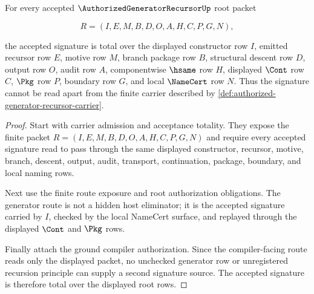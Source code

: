 \begin{theorem}
\label{thm:authorized-generator-recursor-root-signature-totality}
For every accepted $\AuthorizedGeneratorRecursorUp$ root packet

$$
R=(I,E,M,B,D,O,A,H,C,P,G,N),
$$

the accepted signature is total over the displayed constructor row $I$, emitted recursor row $E$, motive row $M$, branch package row $B$, structural descent row $D$, output row $O$, audit row $A$, componentwise $\hsame$ row $H$, displayed $\Cont$ row $C$, $\Pkg$ row $P$, boundary row $G$, and local $\NameCert$ row $N$. Thus the signature cannot be read apart from the finite carrier described by \autoref{def:authorized-generator-recursor-carrier}.
\end{theorem}
\begin{proof}
Start with carrier admission and acceptance totality. They expose the finite packet $R=(I,E,M,B,D,O,A,H,C,P,G,N)$ and require every accepted signature read to pass through the same displayed constructor, recursor, motive, branch, descent, output, audit, transport, continuation, package, boundary, and local naming rows.

Next use the finite route exposure and root authorization obligations. The generator route is not a hidden host eliminator; it is the accepted signature carried by $I$, checked by the local NameCert surface, and replayed through the displayed $\Cont$ and $\Pkg$ rows.

Finally attach the ground compiler authorization. Since the compiler-facing route reads only the displayed packet, no unchecked generator row or unregistered recursion principle can supply a second signature source. The accepted signature is therefore total over the displayed root rows.
\end{proof}

